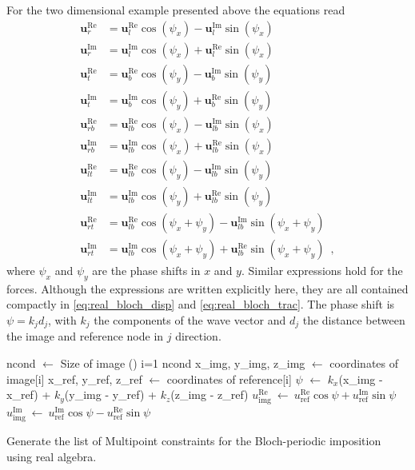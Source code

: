 For the two dimensional example presented above the equations read
\begin{align*}
\mathbf{u}^\text{Re}_r &= \mathbf{u}^\text{Re}_l\cos(\psi_x) - \mathbf{u}^\text{Im}_l\sin(\psi_x)\\
\mathbf{u}^\text{Im}_r &= \mathbf{u}^\text{Im}_l\cos(\psi_x) + \mathbf{u}^\text{Re}_l\sin(\psi_x)\\
\mathbf{u}^\text{Re}_t &= \mathbf{u}^\text{Re}_b\cos(\psi_y) - \mathbf{u}^\text{Im}_b\sin(\psi_y)\\
\mathbf{u}^\text{Im}_t &= \mathbf{u}^\text{Im}_b\cos(\psi_y) + \mathbf{u}^\text{Re}_b\sin(\psi_y)\\
\mathbf{u}^\text{Re}_{rb} &= \mathbf{u}^\text{Re}_{lb}\cos(\psi_x) - \mathbf{u}^\text{Im}_{lb}\sin(\psi_x)\\
\mathbf{u}^\text{Im}_{rb} &= \mathbf{u}^\text{Im}_{lb}\cos(\psi_x) + \mathbf{u}^\text{Re}_{lb}\sin(\psi_x)\\
\mathbf{u}^\text{Re}_{lt} &= \mathbf{u}^\text{Re}_{lb}\cos(\psi_y) - \mathbf{u}^\text{Im}_{lb}\sin(\psi_y)\\
\mathbf{u}^\text{Im}_{lt} &= \mathbf{u}^\text{Im}_{lb}\cos(\psi_y) + \mathbf{u}^\text{Re}_{lb}\sin(\psi_y)\\
\mathbf{u}^\text{Re}_{rt} &= \mathbf{u}^\text{Re}_{lb}\cos(\psi_x + \psi_y) - \mathbf{u}^\text{Im}_{lb}\sin(\psi_x + \psi_y)\\
\mathbf{u}^\text{Im}_{rt} &= \mathbf{u}^\text{Im}_{lb}\cos(\psi_x + \psi_y) + \mathbf{u}^\text{Re}_{lb}\sin(\psi_x + \psi_y) \enspace ,
\end{align*}
where $\psi_x$ and $\psi_y$ are the phase shifts in $x$ and $y$. Similar expressions hold for the forces. Although the expressions are written explicitly here, they are all contained compactly in \eqref{eq:real_bloch_disp} and \eqref{eq:real_bloch_trac}. The phase shift is $\psi = k_j d_j$, with $k_j$ the components of the wave vector and $d_j$ the distance between the image and reference node in $j$ direction.

\begin{algorithm}[h]  
\DontPrintSemicolon
{}
\BlankLine
ncond $\leftarrow$ Size of image\;
\For(){ i=1 \KwTo ncond}{
	x\_img, y\_img, z\_img $\leftarrow$ coordinates of image[i]\;
	x\_ref, y\_ref, z\_ref $\leftarrow$ coordinates of reference[i]\;
	$\psi$ $\leftarrow$ $k_x$(x\_img - x\_ref) + $k_y$(y\_img - y\_ref) + $k_z$(z\_img - z\_ref)\;
	$u_\text{img}^\text{Re}\ \leftarrow\ u_\text{ref}^\text{Re}\cos\psi + u_\text{ref}^\text{Im}\sin\psi$\;
	$u_\text{img}^\text{Im}\ \leftarrow\ u_\text{ref}^\text{Im}\cos\psi - u_\text{ref}^\text{Re}\sin\psi$\;
}

\caption{Generate the list of Multipoint constraints for the Bloch-periodic imposition using real algebra.}\label{algo:bloch_MPC_real}
\end{algorithm}